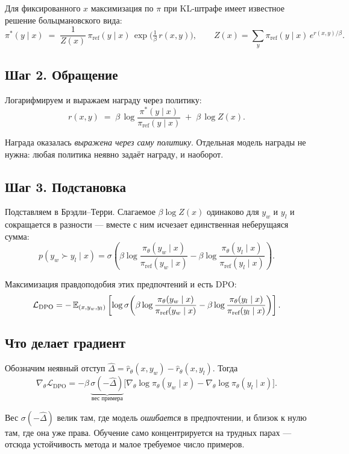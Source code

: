 \documentclass[11pt,a4paper]{article}
\begin{document}
Для фиксированного $x$ максимизация по $\pi$ при KL-штрафе имеет
известное решение больцмановского вида:
\[
\pi^*(y\mid x) \;=\; \frac{1}{Z(x)}\,
\pi_{\text{ref}}(y\mid x)\,\exp\!\Big(\tfrac{1}{\beta}\,r(x,y)\Big),
\qquad
Z(x) = \sum_{y}\pi_{\text{ref}}(y\mid x)\,e^{r(x,y)/\beta}.
\]

\subsection{Шаг 2. Обращение}

Логарифмируем и выражаем награду через политику:
\[
r(x,y) \;=\; \beta\,\log\frac{\pi^*(y\mid x)}{\pi_{\text{ref}}(y\mid x)}
\;+\;\beta\,\log Z(x).
\]

\begin{keybox}
Награда оказалась \emph{выражена через саму политику}. Отдельная модель
награды не нужна: любая политика неявно задаёт награду, и наоборот.
\end{keybox}

\subsection{Шаг 3. Подстановка}

Подставляем в Брэдли–Терри. Слагаемое $\beta\log Z(x)$ одинаково для
$y_w$ и $y_l$ и сокращается в разности — вместе с ним исчезает
единственная неберущаяся сумма:
\[
p(y_w \succ y_l \mid x) = \sigma\!\left(
\beta\log\frac{\pi_\theta(y_w\mid x)}{\pi_{\text{ref}}(y_w\mid x)}
-\beta\log\frac{\pi_\theta(y_l\mid x)}{\pi_{\text{ref}}(y_l\mid x)}
\right).
\]

Максимизация правдоподобия этих предпочтений и есть DPO:
\[
\mathcal{L}_{\text{DPO}} = -\,\mathbb{E}_{(x,y_w,y_l)}
\left[\log\sigma\!\left(
\beta\log\frac{\pi_\theta(y_w\mid x)}{\pi_{\text{ref}}(y_w\mid x)}
-\beta\log\frac{\pi_\theta(y_l\mid x)}{\pi_{\text{ref}}(y_l\mid x)}
\right)\right].
\]

\subsection{Что делает градиент}

Обозначим неявный отступ $\hat\Delta = \hat r_\theta(x,y_w) - \hat r_\theta(x,y_l)$.
Тогда
\[
\nabla_\theta \mathcal{L}_{\text{DPO}} = -\beta\,
\underbrace{\sigma(-\hat\Delta)}_{\text{вес примера}}
\Big[\nabla_\theta\log\pi_\theta(y_w\mid x)
- \nabla_\theta\log\pi_\theta(y_l\mid x)\Big].
\]

Вес $\sigma(-\hat\Delta)$ велик там, где модель \emph{ошибается}
в предпочтении, и близок к нулю там, где она уже права. Обучение само
концентрируется на трудных парах — отсюда устойчивость метода
и малое требуемое число примеров.
\end{document}
